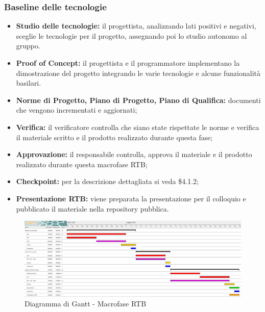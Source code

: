 \subsubsection{Baseline delle tecnologie}
\begin{itemize}
    \item \textbf{Studio delle tecnologie:} il progettista, analizzando lati positivi e negativi, sceglie le tecnologie per il progetto, assegnando poi lo studio autonomo al gruppo.
    \item \textbf{Proof of Concept:} il progettista e il programmatore implementano la dimostrazione del progetto integrando le varie tecnologie e alcune funzionalità basilari.
    \item \textbf{Norme di Progetto, Piano di Progetto, Piano di Qualifica:} documenti che vengono incrementati e aggiornati;
    \item \textbf{Verifica:} il verificatore controlla che siano state rispettate le norme e verifica il materiale scritto e il prodotto realizzato durante questa fase;
    \item \textbf{Approvazione:} il responsabile controlla, approva il materiale e il prodotto realizzato durante questa macrofase RTB;
    \item \textbf{Checkpoint:} per la descrizione dettagliata si veda \$4.1.2;
    \item \textbf{Presentazione RTB:} viene preparata la presentazione per il colloquio e pubblicato il materiale nella repository pubblica.
\end{itemize}


\begin{landscape}
	\begin{figure}
	\includegraphics[width=\linewidth]{images/RTB.png}
    \caption{Diagramma di Gantt - Macrofase RTB}
	\end{figure}
\end{landscape}

\newpage